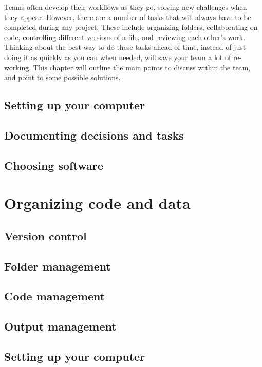 Teams often develop their workflows as they go,
solving new challenges when they appear.
However, there are a number of tasks that will always have to be completed during any project.
These include organizing folders,
collaborating on code,
controlling different versions of a file,
and reviewing each other's work.
Thinking about the best way to do these tasks ahead of time,
instead of just doing it as quickly as you can when needed,
will save your team a lot of re-working.
This chapter will outline the main points to discuss within the team,
and point to some possible solutions.

\subsection{Setting up your computer}

\subsection{Documenting decisions and tasks}

\subsection{Choosing software}

\section{Organizing code and data}

\subsection{Version control}

\subsection{Folder management}

\subsection{Code management}

\subsection{Output management}

\subsection{Setting up your computer}

